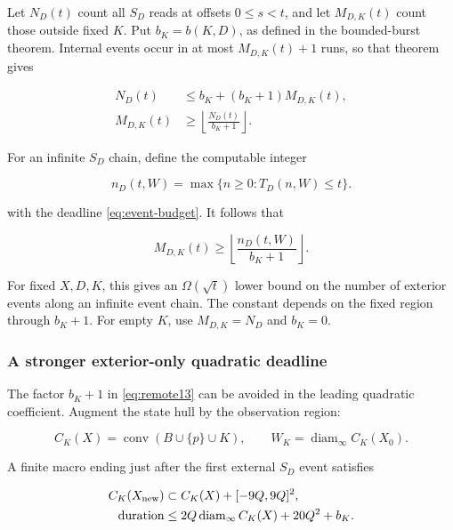 \documentclass[
  11pt,
]{article}
\begin{document}
Let $N_D(t)$ count all $S_D$ reads at offsets $0\le s<t$, and let
$M_{D,K}(t)$ count those outside fixed $K$. Put $b_K=b(K,D)$, as defined
in the bounded-burst theorem. Internal events occur in at most
$M_{D,K}(t)+1$ runs, so that theorem gives

\begin{equation}\label{eq:remote11}
\begin{aligned}N_D(t)&\le b_K+(b_K+1)M_{D,K}(t),\\M_{D,K}(t)&\ge\left\lfloor\frac{N_D(t)}{b_K+1}\right\rfloor.\end{aligned}
\end{equation}

For an infinite $S_D$ chain, define the computable integer

\begin{equation}\label{eq:remote12}
n_D(t,W)=\max\{n\ge0:T_D(n,W)\le t\}.
\end{equation}

with the deadline \eqref{eq:event-budget}. It follows that

\begin{equation}\label{eq:remote13}
M_{D,K}(t)\ge\left\lfloor\frac{n_D(t,W)}{b_K+1}\right\rfloor.
\end{equation}

For fixed $X,D,K$, this gives an $\Omega(\sqrt t)$ lower bound on the
number of exterior events along an infinite event chain. The constant
depends on the fixed region through $b_K+1$. For empty $K$, use
$M_{D,K}=N_D$ and $b_K=0$.

\subsubsection{A stronger exterior-only quadratic
deadline}\label{a-stronger-exterior-only-quadratic-deadline}

The factor $b_K+1$ in \eqref{eq:remote13} can be avoided in the leading quadratic
coefficient. Augment the state hull by the observation region:

\[
C_K(X)=\operatorname{conv}(B\cup\{p\}\cup K),\qquad W_K=\operatorname{diam}_\infty C_K(X_0).
\]

A finite macro ending just after the first external $S_D$ event satisfies

\begin{equation}\label{eq:remote13ab}
\begin{aligned}C_K(X_{\rm new})&\subset C_K(X)+[-9Q,9Q]^2,\\\text{duration}&\le2Q\operatorname{diam}_\infty C_K(X)+20Q^2+b_K.\end{aligned}
\end{equation}
\end{document}
